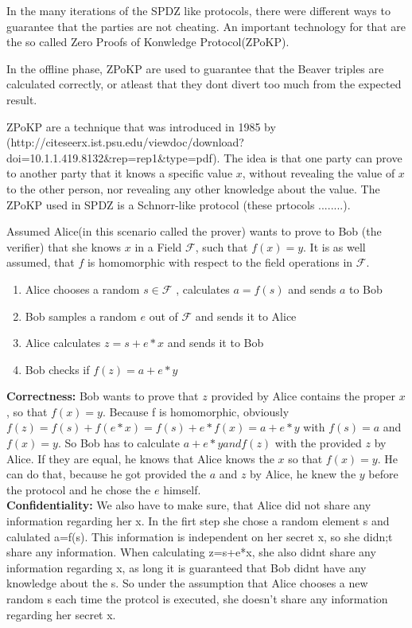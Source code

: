 \documentclass[english,runningheads,a4paper]{llncs}[2018/03/10]
\begin{document}
In the many iterations of the SPDZ like protocols, there were different ways to guarantee that the parties are not cheating. An important technology for that are the so called Zero Proofs of Konwledge Protocol(ZPoKP).

In the offline phase, ZPoKP are used to guarantee that the Beaver triples are calculated correctly, or atleast that they dont divert too much from the expected result.


ZPoKP are a technique that was introduced  in 1985 by (http://citeseerx.ist.psu.edu/viewdoc/download?doi=10.1.1.419.8132\&rep=rep1\&type=pdf). The idea is that one party can prove to another party that it knows a specific value \(x\), without revealing the value of \(x\) to the other person, nor revealing any other knowledge about the value. 
The ZPoKP used in SPDZ is a Schnorr-like protocol (these prtocols ........).

Assumed Alice(in this scenario called the prover) wants to prove to Bob (the verifier) that she knows \( x\) in a Field \( \mathcal{F} \), such that \(f(x)=y\). It is as well assumed, that \( f \) is homomorphic with respect to the field operations in  \( \mathcal{F} \).
\begin{enumerate}
\item Alice chooses a random \( s \in \mathcal{F} \) , calculates \( a = f(s)\) and sends \( a\) to Bob
\item Bob samples a random  \( e \) out of  \( \mathcal{F} \) and sends it to Alice
\item Alice calculates \( z=s+e*x\) and sends it to Bob
\item Bob checks if \( f(z)=a+e*y\)
\end{enumerate}

\textbf{Correctness:}
Bob wants to prove that \( z\) provided by Alice contains the proper \( x\), so that \( f(x)=y\). 
Because f is homomorphic, obviously \( f(z)=f(s)+f(e*x)=f(s)+e*f(x)=a+e*y\) with \(f(s)=a\) and \(f(x)=y\).
So Bob has to calculate \( a+e*y and f(z)\) with the provided \( z\) by Alice. If they are equal, he knows that Alice knows the \( x\) so that \( f(x)=y\).
He can do that, because he got provided the \( a\) and \( z\) by Alice, he knew the \( y\) before the protocol and he chose the \( e\) himself.\\

\textbf{Confidentiality:}
We also have to make sure, that Alice did not share any information regarding her x.
In the firt step she chose a random element s and calulated a=f(s). This information is independent on her secret x, so she didn;t share any information.
When calculating z=s+e*x, she also didnt share any information regarding x, as long it is guaranteed that Bob didnt have any knowledge about the s.
So under the assumption that Alice chooses a new random s each time the protcol is executed, she doesn't share any information regarding her secret x.\\
\end{document}
